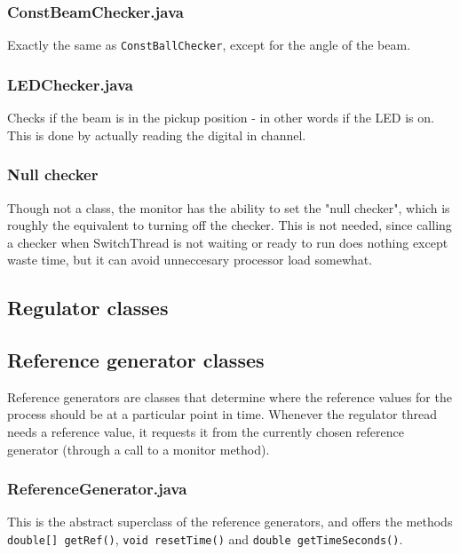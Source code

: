 \subsubsection{ConstBeamChecker.java}

Exactly the same as \texttt{ConstBallChecker}, except for the angle of the beam.

\subsubsection{LEDChecker.java}

Checks if the beam is in the pickup position - in other words if the LED is on. This is done by actually reading the digital in channel.

\subsubsection{Null checker}

Though not a class, the monitor has the ability to set the "null checker", which is roughly the equivalent to turning off the checker. This is not needed, since calling a checker when SwitchThread is not waiting or ready to run does nothing except waste time, but it can avoid unneccesary processor load somewhat.

\subsection{Regulator classes}

\subsection{Reference generator classes}

Reference generators are classes that determine where the reference values for the process should be at a particular point in time. Whenever the regulator thread needs a reference value, it requests it from the currently chosen reference generator  (through a call to a monitor method).
 
\subsubsection{ReferenceGenerator.java}

This is the abstract superclass of the reference generators, and offers the methods \texttt{double[] getRef()}, \texttt{void resetTime()} and \texttt{double getTimeSeconds()}.

